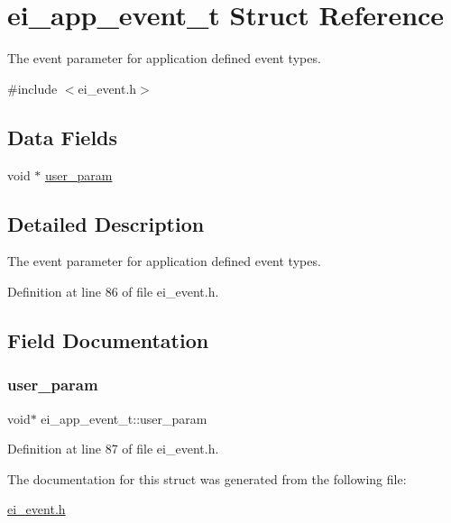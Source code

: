 \hypertarget{structei__app__event__t}{}\section{ei\+\_\+app\+\_\+event\+\_\+t Struct Reference}
\label{structei__app__event__t}


The event parameter for application defined event types.  




{\ttfamily \#include $<$ei\+\_\+event.\+h$>$}

\subsection*{Data Fields}
\begin{DoxyCompactItemize}
\item 
void $\ast$ \hyperlink{structei__app__event__t_a236a89c3726aa9c770da42ba37ce3d3f}{user\+\_\+param}
\end{DoxyCompactItemize}


\subsection{Detailed Description}
The event parameter for application defined event types. 

Definition at line 86 of file ei\+\_\+event.\+h.



\subsection{Field Documentation}
\mbox{\label{structei__app__event__t_a236a89c3726aa9c770da42ba37ce3d3f}} 
\subsubsection{\texorpdfstring{user\+\_\+param}{user\_param}}
{\footnotesize\ttfamily void$\ast$ ei\+\_\+app\+\_\+event\+\_\+t\+::user\+\_\+param}



Definition at line 87 of file ei\+\_\+event.\+h.



The documentation for this struct was generated from the following file\+:\begin{DoxyCompactItemize}
\item 
\hyperlink{ei__event_8h}{ei\+\_\+event.\+h}\end{DoxyCompactItemize}
